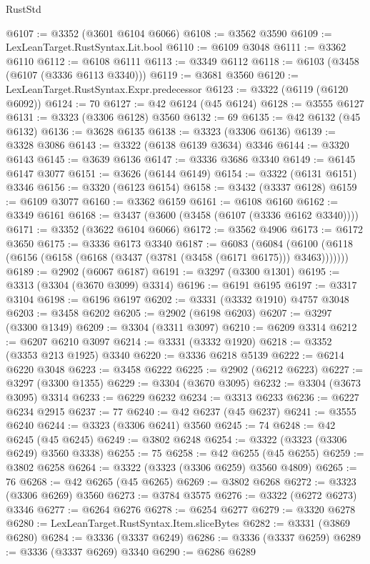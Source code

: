 \begin{lexlean}{RustStd}
\begin{coremodule}
@6107 := @3352 (@3601 @6104 @6066)
@6108 := @3562 @3590
@6109 := LexLeanTarget.RustSyntax.Lit.bool
@6110 := @6109 @3048
@6111 := @3362 @6110
@6112 := @6108 @6111
@6113 := @3349 @6112
@6118 := @6103 (@3458 (@6107 (@3336 @6113 @3340)))
@6119 := @3681 @3560
@6120 := LexLeanTarget.RustSyntax.Expr.predecessor
@6123 := @3322 (@6119 (@6120 @6092))
@6124 := 70
@6127 := @42 @6124 (@45 @6124)
@6128 := @3555 @6127
@6131 := @3323 (@3306 @6128) @3560
@6132 := 69
@6135 := @42 @6132 (@45 @6132)
@6136 := @3628 @6135
@6138 := @3323 (@3306 @6136)
@6139 := @3328 @3086
@6143 := @3322 (@6138 @6139 @3634) @3346
@6144 := @3320 @6143
@6145 := @3639 @6136
@6147 := @3336 @3686 @3340
@6149 := @6145 @6147 @3077
@6151 := @3626 (@6144 @6149)
@6154 := @3322 (@6131 @6151) @3346
@6156 := @3320 (@6123 @6154)
@6158 := @3432 (@3337 @6128)
@6159 := @6109 @3077
@6160 := @3362 @6159
@6161 := @6108 @6160
@6162 := @3349 @6161
@6168 := @3437 (@3600 (@3458 (@6107 (@3336 @6162 @3340))))
@6171 := @3352 (@3622 @6104 @6066)
@6172 := @3562 @4906
@6173 := @6172 @3650
@6175 := @3336 @6173 @3340
@6187 := @6083
    (@6084 (@6100 (@6118 (@6156 (@6158 (@6168 (@3437 (@3781 (@3458 (@6171 @6175))) @3463)))))))
@6189 := @2902 (@6067 @6187)
@6191 := @3297 (@3300 @1301)
@6195 := @3313 (@3304 (@3670 @3099) @3314)
@6196 := @6191 @6195
@6197 := @3317 @3104
@6198 := @6196 @6197
@6202 := @3331 (@3332 @1910) @4757 @3048
@6203 := @3458 @6202
@6205 := @2902 (@6198 @6203)
@6207 := @3297 (@3300 @1349)
@6209 := @3304 (@3311 @3097)
@6210 := @6209 @3314
@6212 := @6207 @6210 @3097
@6214 := @3331 (@3332 @1920)
@6218 := @3352 (@3353 @213 @1925) @3340
@6220 := @3336 @6218 @5139
@6222 := @6214 @6220 @3048
@6223 := @3458 @6222
@6225 := @2902 (@6212 @6223)
@6227 := @3297 (@3300 @1355)
@6229 := @3304 (@3670 @3095)
@6232 := @3304 (@3673 @3095) @3314
@6233 := @6229 @6232
@6234 := @3313 @6233
@6236 := @6227 @6234 @2915
@6237 := 77
@6240 := @42 @6237 (@45 @6237)
@6241 := @3555 @6240
@6244 := @3323 (@3306 @6241) @3560
@6245 := 74
@6248 := @42 @6245 (@45 @6245)
@6249 := @3802 @6248
@6254 := @3322 (@3323 (@3306 @6249) @3560 @3338)
@6255 := 75
@6258 := @42 @6255 (@45 @6255)
@6259 := @3802 @6258
@6264 := @3322 (@3323 (@3306 @6259) @3560 @4809)
@6265 := 76
@6268 := @42 @6265 (@45 @6265)
@6269 := @3802 @6268
@6272 := @3323 (@3306 @6269) @3560
@6273 := @3784 @3575
@6276 := @3322 (@6272 @6273) @3346
@6277 := @6264 @6276
@6278 := @6254 @6277
@6279 := @3320 @6278
@6280 := LexLeanTarget.RustSyntax.Item.sliceBytes
@6282 := @3331 (@3869 @6280)
@6284 := @3336 (@3337 @6249)
@6286 := @3336 (@3337 @6259)
@6289 := @3336 (@3337 @6269) @3340
@6290 := @6286 @6289

\end{coremodule}
\end{lexlean}
